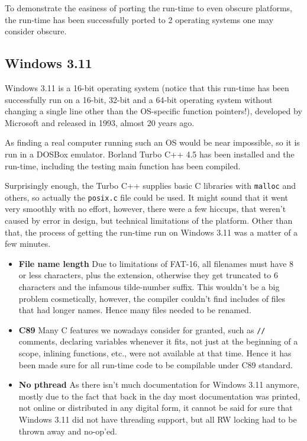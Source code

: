 To demonstrate the easiness of porting the run-time to even obscure platforms, the run-time has been successfully ported to 2 operating systems one may consider obscure.

\subsection{Windows 3.11}

Windows 3.11 is a 16-bit operating system (notice that this run-time has been successfully run on a 16-bit, 32-bit and a 64-bit operating system without changing a single line other than the OS-specific function pointers!), developed by Microsoft and released in 1993, almost 20 years ago.

As finding a real computer running such an OS would be near impossible, so it is run in a DOSBox emulator. Borland Turbo C++ 4.5 has been installed and the run-time, including the testing main function has been compiled.

Surprisingly enough, the Turbo C++ supplies basic C libraries with \verb=malloc= and others, so actually the \verb=posix.c= file could be used. It might sound that it went very smoothly with no effort, however, there were a few hiccups, that weren't caused by error in design, but technical limitations of the platform. Other than that, the process of getting the run-time run on Windows 3.11 was a matter of a few minutes.

\begin{itemize}
  \item{\bf{File name length}} Due to limitations of FAT-16, all filenames must have 8 or less characters, plus the extension, otherwise they get truncated to 6 characters and the infamous tilde-number suffix. This wouldn't be a big problem cosmetically, however, the compiler couldn't find includes of files that had longer names. Hence many files needed to be renamed.
  \item{\bf{C89}} Many C features we nowadays consider for granted, such as \verb=//= comments, declaring variables whenever it fits, not just at the beginning of a scope, inlining functions, etc., were not available at that time. Hence it has been made sure for all run-time code to be compilable under C89 standard.
  \item{\bf{No pthread}} As there isn't much documentation for Windows 3.11 anymore, mostly due to the fact that back in the day most documentation was printed, not online or distributed in any digital form, it cannot be said for sure that Windows 3.11 did not have threading support, but all RW locking had to be thrown away and no-op'ed. 
\end{itemize}

